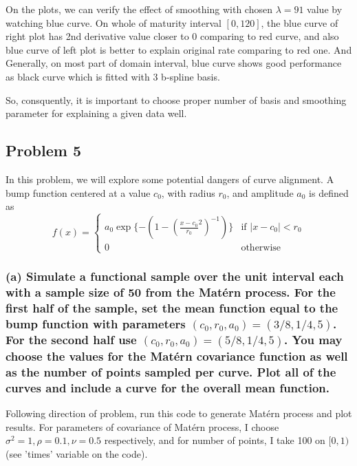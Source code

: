 \documentclass{article}
\begin{document}
On the plots, we can verify the effect of smoothing with chosen $\lambda=91$ value by watching blue curve.
On whole of maturity interval $[0,120]$, the blue curve of right plot has 2nd derivative value closer to 0 comparing to red curve,
and also blue curve of left plot is better to explain original rate comparing to red one.
And Generally, on most part of domain interval, blue curve shows good performance as black curve which is fitted with 3 b-spline basis.

So, consquently, it is important to choose proper number of basis and smoothing parameter for explaining a given data well.



\newpage
\subsection{Problem 5}
In this problem, we will explore some potential dangers of curve alignment. 
A bump function centered at a value $c_0$, with radius $r_0$, and amplitude $a_0$ is defined as 
\begin{equation*}
    f(x) = \begin{cases}
        a_0\exp{\{-(1-(\frac{x-c_0}{r_0}^2)^{-1})\}} &\text{if } |x-c_0|<r_0 \\
        0 &\text{otherwise}
    \end{cases}
\end{equation*}
\subsubsection*{(a) Simulate a functional sample over the unit interval each with a sample size of 50 from the Mat\'{e}rn process. 
For the first half of the sample, set the mean function equal to the bump function with parameters $(c_0,r_0,a_0)=(3/8,1/4,5)$.
For the second half use $(c_0,r_0,a_0)=(5/8,1/4,5)$.
You may choose the values for the Mat\'{e}rn covariance function as well as the number of points sampled per curve.
Plot all of the curves and include a curve for the overall mean function.}

Following direction of problem, run this code to generate Mat\'{e}rn process and plot results.
For parameters of covariance of Mat\'{e}rn process, I choose $\sigma^2=1, \rho=0.1, \nu=0.5$ respectively,
and for number of points, I take 100 on $[0,1)$ (see 'times' variable on the code).
\end{document}
